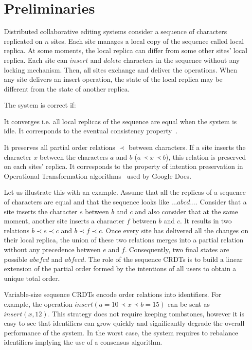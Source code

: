 \section{Preliminaries}
\label{sec:background}

Distributed collaborative editing systems consider a sequence of characters
replicated on $n$ sites. Each site manages a local copy of the sequence called
local replica. At some moments, the local replica can differ from some other
sites' local replica. Each site can $insert$ and $delete$ characters in the
sequence without any locking mechanism. Then, all sites exchange and deliver
the operations. When any site delivers an insert operation, the state of the
local replica may be different from the state of another replica.

The system is correct if:
\begin{inparaenum}[(i)]
\item It converges i.e. all local replicas of the sequence are equal when the
  system is idle. It corresponds to the eventual consistency
  property~\cite{johnson1975maintenance}.
\item It preserves all partial order relations $\prec$ between characters. If a
  site inserts the character $x$ between the characters $a$ and $b$ ($a \prec x
  \prec b$), this relation is preserved on each sites' replica. It
  corresponds to the property of intention preservation in Operational
  Transformation algorithms~\cite{sun1998achieving} used by Google Docs.
\end{inparaenum}

Let us illustrate this with an example. Assume that all the replicas of a
sequence of characters are equal and that the sequence looks like
$...abcd...$. Consider that a site inserts the character $e$ between $b$ and
$c$ and also consider that at the same moment, another site inserts a character
$f$ between $b$ and $c$. It results in two relations $b \prec e \prec c$ and $b
\prec f \prec c$. Once every site has delivered all the changes on their local
replica, the union of these two relations merges into a partial relation
without any precedence between $e$ and $f$. Consequently, two final states are
possible $abefcd$ and $abfecd$. The role of the sequence CRDTs is to build a
linear extension of the partial order formed by the intentions of all users to
obtain a unique total order.

Variable-size sequence CRDTs encode order relations into identifiers. For
example, the operation $insert(a=10 \prec x \prec b=15)$ can be sent as
$insert(x,12)$. This strategy does not require keeping tombstones, however it
is easy to see that identifiers can grow quickly and significantly degrade the
overall performance of the system. In the worst case, the system requires to
rebalance identifiers implying the use of a consensus algorithm.

